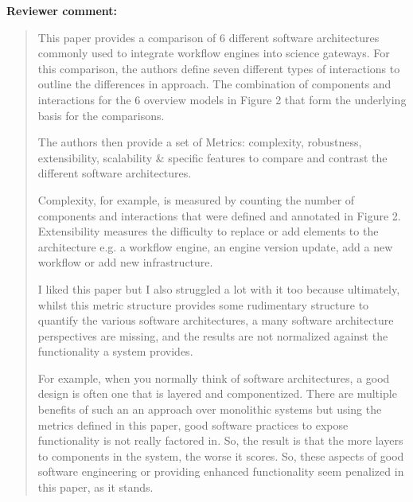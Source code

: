 \documentclass[a4]{article}
\newenvironment{review}%
{\textbf{Reviewer comment:}\begin{quote}}%
{\end{quote}}%
\begin{document}
\begin{review}
This paper provides a comparison of 6 different software architectures commonly used to integrate workflow engines into science gateways. For this comparison, the authors define seven different types of interactions to outline the differences in approach. The combination of components and interactions for the 6 overview models in Figure 2 that form the underlying basis for the comparisons.

The authors then provide a set of Metrics: complexity, robustness, extensibility, scalability \& specific features to compare and contrast the different software architectures.

Complexity, for example, is measured by counting the number of components and interactions that were defined and annotated in Figure 2.  Extensibility measures the difficulty to replace or add elements to the architecture e.g. a workflow engine, an engine version update, add a new workflow or add new infrastructure. 

I liked this paper but I also struggled a lot with it too because ultimately, whilst this metric structure provides some rudimentary structure to quantify the various software architectures, a many software architecture perspectives are missing, and the results are not normalized against the functionality a system provides.

For example, when you normally think of software architectures, a good design is often one that is layered and componentized. There are multiple benefits of such an an approach over monolithic systems but using the metrics defined in this paper, good software practices to expose functionality is not really factored in. So, the result is that the more layers to components in the system, the worse it scores. So, these aspects of good software engineering or providing enhanced functionality seem penalized in this paper, as it stands. 
\end{review}
\end{document}
